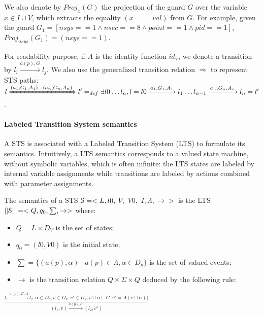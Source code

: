 We also denote by $Proj_{x}(G)$ the projection of the guard $G$ over
the variable $x \in I \cup V$, which extracts the equality
$(x==val)$ from $G$. For example, given the guard $G_1 = [nsys==1
\wedge nsec==8 \wedge point==1 \wedge pid==1]$, $Proj_{nsys}(G_1)
= (nsys==1)$.

For readability purpose, if $A$ is the identity function $id_V$,
we denote a transition by $l_i \xrightarrow{a(p),G} l_j$. We
also use the generalized transition relation $\Rightarrow$ to
represent STS paths: $l \xRightarrow{(a_1,G_1,A_1)\dots
(a_n,G_n,A_n)} l' =_{def} \exists l0\dots l_n, l=l0
\xrightarrow{a_1,G_1,A_1} l_1\dots
l_{n-1}\xrightarrow{a_n,G_n,A_n}l_n=l'$.

\paragraph{Labeled Transition System semantics}
\label{sec:definitions:lts-semantics}

A STS is associated with a Labeled Transition System (LTS) to
formulate its semantics. Intuitively, a LTS semantics corresponds
to a valued state machine, without symbolic variables, which is
often infinite: the LTS states are labeled by internal variable
assignments while transitions are labeled by actions combined
with parameter assignments.

\begin{definition}
    The semantics of a STS $\EuScript{S}=<L,l0,$ $V,$ $V0,$
    $I,\Lambda,\rightarrow>$ is the LTS
    $||\EuScript{S}||=<Q,q_0,\sum,\rightarrow>$ where:

	\begin{itemize}

		\item $Q=L \times D_V$ is the set of states;

        \item $q_0=(l0,V0)$ is the initial state;

		\item $\sum=\{(a(p),\alpha)  \mid  a(p)\in\Lambda, \alpha \in
		D_p\}$ is the set of valued events;

        \item $\rightarrow$ is the transition relation $Q \times
        \Sigma \times Q$ deduced by the following rule:\\
	\end{itemize}
	\begin{center}
    {\Large
    $\frac{l_1 \xrightarrow{a(p),G,A}l_2,\alpha \in D_p, v \in D_V, v'
        \in D_V, v \cup \alpha \models G, v'=A(v \cup \alpha))}{(l_1,v)
            \xrightarrow{a(p),\alpha} (l_2,v') }$
    }
	\end{center}

	\label{def:semantics}
\end{definition}

